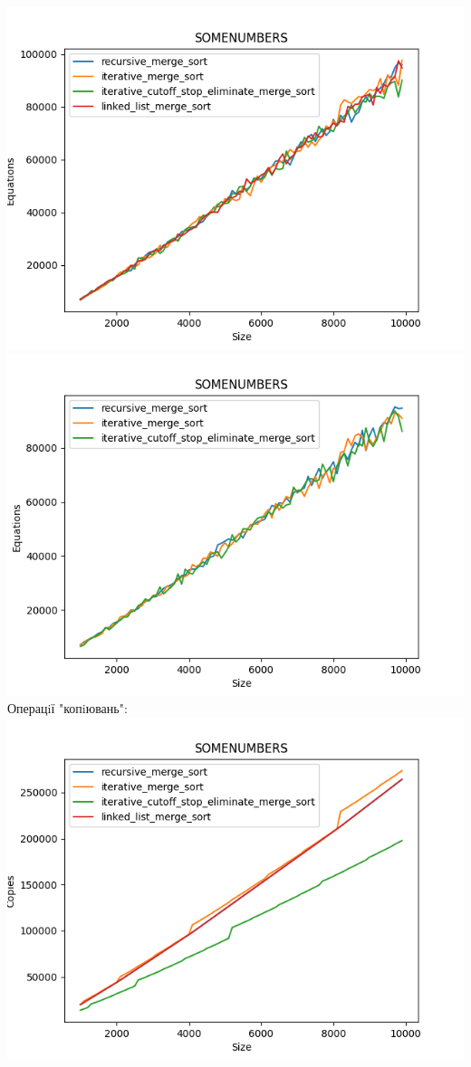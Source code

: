 \documentclass{article}
\begin{document}
            \includegraphics[scale=0.5]{somenumbers_Equations_4_sorts_90_numbers_50.png}
            \includegraphics[scale=0.5]{somenumbers_Equations_3_sorts_90_numbers_50.png}
        \newpage
        Операцiї "копiювань":
        \newline
            \includegraphics[scale=0.5]{somenumbers_Copies_4_sorts_90_numbers_50.png}
\end{document}
